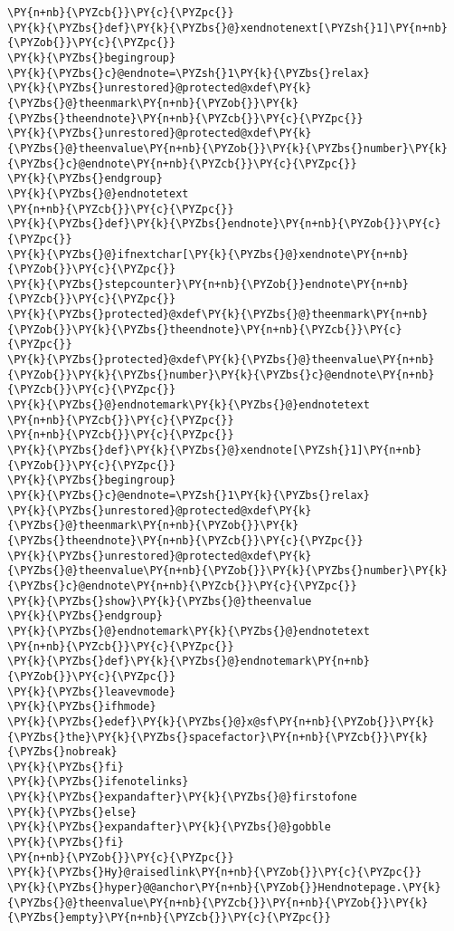 \begin{Verbatim}[commandchars=\\\{\}]
\PY{n+nb}{\PYZcb{}}\PY{c}{\PYZpc{}}
\PY{k}{\PYZbs{}def}\PY{k}{\PYZbs{}@}xendnotenext[\PYZsh{}1]\PY{n+nb}{\PYZob{}}\PY{c}{\PYZpc{}}
\PY{k}{\PYZbs{}begingroup}
\PY{k}{\PYZbs{}c}@endnote=\PYZsh{}1\PY{k}{\PYZbs{}relax}
\PY{k}{\PYZbs{}unrestored}@protected@xdef\PY{k}{\PYZbs{}@}theenmark\PY{n+nb}{\PYZob{}}\PY{k}{\PYZbs{}theendnote}\PY{n+nb}{\PYZcb{}}\PY{c}{\PYZpc{}}
\PY{k}{\PYZbs{}unrestored}@protected@xdef\PY{k}{\PYZbs{}@}theenvalue\PY{n+nb}{\PYZob{}}\PY{k}{\PYZbs{}number}\PY{k}{\PYZbs{}c}@endnote\PY{n+nb}{\PYZcb{}}\PY{c}{\PYZpc{}}
\PY{k}{\PYZbs{}endgroup}
\PY{k}{\PYZbs{}@}endnotetext
\PY{n+nb}{\PYZcb{}}\PY{c}{\PYZpc{}}
\PY{k}{\PYZbs{}def}\PY{k}{\PYZbs{}endnote}\PY{n+nb}{\PYZob{}}\PY{c}{\PYZpc{}}
\PY{k}{\PYZbs{}@}ifnextchar[\PY{k}{\PYZbs{}@}xendnote\PY{n+nb}{\PYZob{}}\PY{c}{\PYZpc{}}
\PY{k}{\PYZbs{}stepcounter}\PY{n+nb}{\PYZob{}}endnote\PY{n+nb}{\PYZcb{}}\PY{c}{\PYZpc{}}
\PY{k}{\PYZbs{}protected}@xdef\PY{k}{\PYZbs{}@}theenmark\PY{n+nb}{\PYZob{}}\PY{k}{\PYZbs{}theendnote}\PY{n+nb}{\PYZcb{}}\PY{c}{\PYZpc{}}
\PY{k}{\PYZbs{}protected}@xdef\PY{k}{\PYZbs{}@}theenvalue\PY{n+nb}{\PYZob{}}\PY{k}{\PYZbs{}number}\PY{k}{\PYZbs{}c}@endnote\PY{n+nb}{\PYZcb{}}\PY{c}{\PYZpc{}}
\PY{k}{\PYZbs{}@}endnotemark\PY{k}{\PYZbs{}@}endnotetext
\PY{n+nb}{\PYZcb{}}\PY{c}{\PYZpc{}}
\PY{n+nb}{\PYZcb{}}\PY{c}{\PYZpc{}}
\PY{k}{\PYZbs{}def}\PY{k}{\PYZbs{}@}xendnote[\PYZsh{}1]\PY{n+nb}{\PYZob{}}\PY{c}{\PYZpc{}}
\PY{k}{\PYZbs{}begingroup}
\PY{k}{\PYZbs{}c}@endnote=\PYZsh{}1\PY{k}{\PYZbs{}relax}
\PY{k}{\PYZbs{}unrestored}@protected@xdef\PY{k}{\PYZbs{}@}theenmark\PY{n+nb}{\PYZob{}}\PY{k}{\PYZbs{}theendnote}\PY{n+nb}{\PYZcb{}}\PY{c}{\PYZpc{}}
\PY{k}{\PYZbs{}unrestored}@protected@xdef\PY{k}{\PYZbs{}@}theenvalue\PY{n+nb}{\PYZob{}}\PY{k}{\PYZbs{}number}\PY{k}{\PYZbs{}c}@endnote\PY{n+nb}{\PYZcb{}}\PY{c}{\PYZpc{}}
\PY{k}{\PYZbs{}show}\PY{k}{\PYZbs{}@}theenvalue
\PY{k}{\PYZbs{}endgroup}
\PY{k}{\PYZbs{}@}endnotemark\PY{k}{\PYZbs{}@}endnotetext
\PY{n+nb}{\PYZcb{}}\PY{c}{\PYZpc{}}
\PY{k}{\PYZbs{}def}\PY{k}{\PYZbs{}@}endnotemark\PY{n+nb}{\PYZob{}}\PY{c}{\PYZpc{}}
\PY{k}{\PYZbs{}leavevmode}
\PY{k}{\PYZbs{}ifhmode}
\PY{k}{\PYZbs{}edef}\PY{k}{\PYZbs{}@}x@sf\PY{n+nb}{\PYZob{}}\PY{k}{\PYZbs{}the}\PY{k}{\PYZbs{}spacefactor}\PY{n+nb}{\PYZcb{}}\PY{k}{\PYZbs{}nobreak}
\PY{k}{\PYZbs{}fi}
\PY{k}{\PYZbs{}ifenotelinks}
\PY{k}{\PYZbs{}expandafter}\PY{k}{\PYZbs{}@}firstofone
\PY{k}{\PYZbs{}else}
\PY{k}{\PYZbs{}expandafter}\PY{k}{\PYZbs{}@}gobble
\PY{k}{\PYZbs{}fi}
\PY{n+nb}{\PYZob{}}\PY{c}{\PYZpc{}}
\PY{k}{\PYZbs{}Hy}@raisedlink\PY{n+nb}{\PYZob{}}\PY{c}{\PYZpc{}}
\PY{k}{\PYZbs{}hyper}@@anchor\PY{n+nb}{\PYZob{}}Hendnotepage.\PY{k}{\PYZbs{}@}theenvalue\PY{n+nb}{\PYZcb{}}\PY{n+nb}{\PYZob{}}\PY{k}{\PYZbs{}empty}\PY{n+nb}{\PYZcb{}}\PY{c}{\PYZpc{}}

\end{Verbatim}
